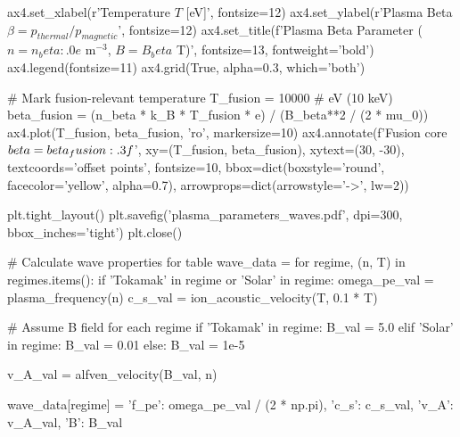 \documentclass[11pt,a4paper]{article}
\begin{document}
\begin{pycode}
ax4.set_xlabel(r'Temperature $T$ [eV]', fontsize=12)
ax4.set_ylabel(r'Plasma Beta $\beta = p_{thermal}/p_{magnetic}$', fontsize=12)
ax4.set_title(f'Plasma Beta Parameter ($n = {n_beta:.0e}$ m$^{{-3}}$, $B = {B_beta}$ T)',
             fontsize=13, fontweight='bold')
ax4.legend(fontsize=11)
ax4.grid(True, alpha=0.3, which='both')

# Mark fusion-relevant temperature
T_fusion = 10000  # eV (10 keV)
beta_fusion = (n_beta * k_B * T_fusion * e) / (B_beta**2 / (2 * mu_0))
ax4.plot(T_fusion, beta_fusion, 'ro', markersize=10)
ax4.annotate(f'Fusion core\n$\\beta = {beta_fusion:.3f}$', xy=(T_fusion, beta_fusion),
            xytext=(30, -30), textcoords='offset points',
            fontsize=10, bbox=dict(boxstyle='round', facecolor='yellow', alpha=0.7),
            arrowprops=dict(arrowstyle='->', lw=2))

plt.tight_layout()
plt.savefig('plasma_parameters_waves.pdf', dpi=300, bbox_inches='tight')
plt.close()

# Calculate wave properties for table
wave_data = {}
for regime, (n, T) in regimes.items():
    if 'Tokamak' in regime or 'Solar' in regime:
        omega_pe_val = plasma_frequency(n)
        c_s_val = ion_acoustic_velocity(T, 0.1 * T)

        # Assume B field for each regime
        if 'Tokamak' in regime:
            B_val = 5.0
        elif 'Solar' in regime:
            B_val = 0.01
        else:
            B_val = 1e-5

        v_A_val = alfven_velocity(B_val, n)

        wave_data[regime] = {
            'f_pe': omega_pe_val / (2 * np.pi),
            'c_s': c_s_val,
            'v_A': v_A_val,
            'B': B_val
        }
\end{pycode}
\end{document}

